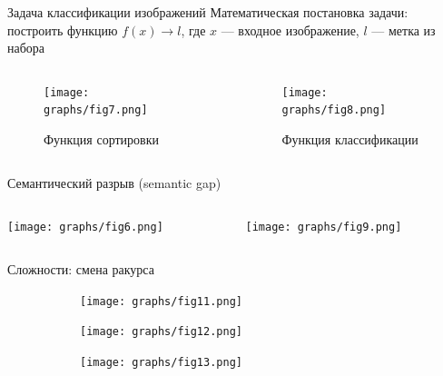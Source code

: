 \documentclass[aspectratio=169]{beamer}
\begin{document}
\begin{frame}{Задача классификации изображений}
    Математическая постановка задачи:\pause{} построить функцию
     \( f(x) \rightarrow l\), где \(x\) --- входное изображение,
     \(l\) --- метка из набора
    \pause{}
    \vfill
    \begin{columns}
        \begin{column}{0.49\linewidth}
            \begin{figure}
                \centering
                \texttt{[image: graphs/fig7.png]}
                \caption{Функция сортировки}
            \end{figure}
        \end{column}
        \pause{}
        \begin{column}{0.49\linewidth}
            \begin{figure}
                \centering
                \texttt{[image: graphs/fig8.png]}
                \caption{Функция классификации}
            \end{figure}
        \end{column}
    \end{columns}
\end{frame}

\begin{frame}{Семантический разрыв (semantic gap)}
    \begin{columns}
        \begin{column}{0.4\linewidth}
            \texttt{[image: graphs/fig6.png]}
        \end{column}
        \pause{}
        \begin{column}{0.6\linewidth}
            \texttt{[image: graphs/fig9.png]}
        \end{column}
    \end{columns}
\end{frame}

\begin{frame}{Сложности: смена ракурса}
    \begin{figure}
        \begin{subfigure}[b]{0.32\linewidth}
            \centering
            \texttt{[image: graphs/fig11.png]}
        \end{subfigure}
        \begin{subfigure}[b]{0.32\linewidth}
            \centering
            \texttt{[image: graphs/fig12.png]}
        \end{subfigure}
        \begin{subfigure}[b]{0.32\linewidth}
            \centering
            \texttt{[image: graphs/fig13.png]}
        \end{subfigure}
    \end{figure}
\end{frame}
\end{document}
